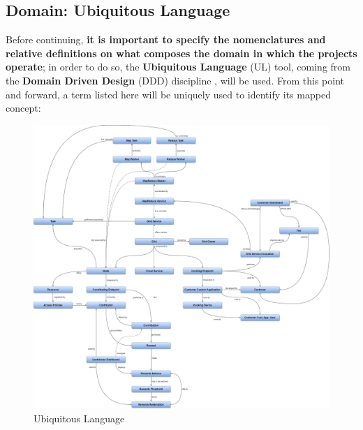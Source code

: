 \subsection{Domain: Ubiquitous Language}\label{ubiquitous_language}
Before continuing, \textbf{it is important to specify the nomenclatures and relative definitions on what composes the domain in which the projects operate}; in order to do so, the \textbf{Ubiquitous Language} (UL) tool, coming from the \textbf{Domain Driven Design} (DDD) discipline \cite{ddd}, will be used. From this point and forward, a term listed here will be uniquely used to identify its mapped concept:
\begin{figure}[!ht]
    \centering
    \includegraphics[width=\linewidth]{document/chapters/chapter_4/images/ul.jpg}
    \caption{Ubiquitous Language}
    \label{fig:ul}
\end{figure}
